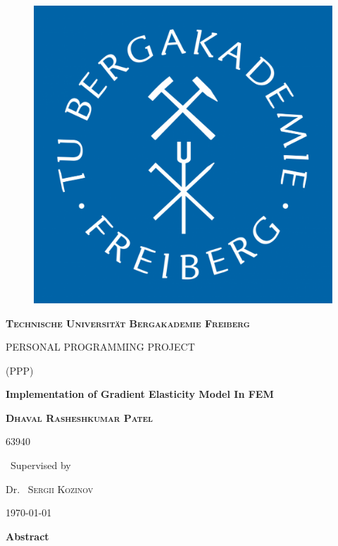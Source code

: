 \documentclass[12pt]{article}
\begin{document}
	\begin{titlepage}
		\centering
		
		\begin{figure}
			\begin{center}
				\includegraphics[scale=.2]{tubaf.pdf}  
			\end{center}
			
		\end{figure}
		
		
		
		{\scshape \LARGE \textbf{Technische Universit\"at Bergakademie Freiberg} \par}
		\vspace{1cm}
		{\scshape\Large PERSONAL PROGRAMMING PROJECT\par}
		{\scshape\Large (PPP)\par}
		\vspace{1.5cm}
		{\huge\bfseries Implementation of Gradient Elasticity Model In FEM \par}
		\vspace{2cm}
		{\scshape\Large \textbf{Dhaval Rasheshkumar Patel}\par}
		{\scshape\Large 63940\par}
		\vfill
		{\normalsize\ Supervised by\par}
		
		Dr.~ \textsc{Sergii Kozinov}
		
		\vfill
		
		{\large \today\par}
	\end{titlepage}
	\clearpage
    \textbf{\LARGE Abstract}\\ \newline
    \newline
\end{document}
